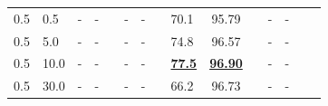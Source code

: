 \documentclass[lang=chs, degree=master, blindreview=false, adobe=false]{yanputhesis}
\begin{document}
\begin{table}[!htbp]
{\begin{tabular}{p{10mm}p{20mm}p{5mm}cp{10mm}p{5mm}cp{10mm}p{5mm}cp{10mm}p{5mm}cp{10mm}p{5mm}}
  0.5   & 0.5   & - & - && %
                  - & - && %
                  70.1 & 95.79 &&  %
                  - & - \\  %
  0.5   & 5.0   & - & - && %
                  - & - && %
                  74.8 & 96.57 &&  %
                  - & - \\  %
  0.5   & 10.0  & - & - && %
                  - & - && %
                  \underline{\textbf{77.5}} &
                  \underline{\textbf{96.90}} &&  %
                  - & - \\  %
  0.5   & 30.0  & - & - && %
                  - & - && %
                  66.2 & 96.73 &&  %
                  - & - \\  %
  \bottomrule
\end{tabular}
  }
\label{tab:AdPPram_ablation}
\end{table}
\end{document}
